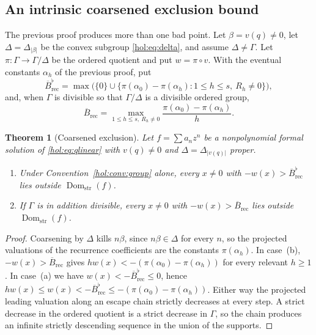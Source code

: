 \documentclass[11pt]{article}
\numberwithin{equation}{section}
\newtheorem{theorem}{Theorem}[section]
\theoremstyle{definition}
\theoremstyle{remark}
\newcommand{\Dom}{\operatorname{Dom}_{\mathrm{str}}}
\newcommand{\abs}[1]{\lvert#1\rvert}
\begin{document}
\subsection{An intrinsic coarsened exclusion bound}

The previous proof produces more than one bad point. Let $\beta=v(q)\ne0$, let
$\Delta=\Delta_{\abs\beta}$ be the convex subgroup \eqref{hol:eq:delta}, and
assume $\Delta\ne\Gamma$. Let $\pi:\Gamma\to\Gamma/\Delta$ be the ordered
quotient and put $w=\pi\circ v$. With the eventual constants $\alpha_h$ of the
previous proof, put
\begin{equation}\label{hol:eq:coarsebound0}
 \overline B^{\flat}_{\mathrm{rec}}
 =\max\bigl(\{0\}\cup\{\pi(\alpha_0)-\pi(\alpha_h):1\le h\le s,\ R_h\ne0\}\bigr),
\end{equation}
and, when $\Gamma$ is divisible so that $\Gamma/\Delta$ is a divisible ordered
group,
\begin{equation}\label{hol:eq:coarsebound}
 \overline B_{\mathrm{rec}}
 =\max_{1\le h\le s,\ R_h\ne0}\frac{\pi(\alpha_0)-\pi(\alpha_h)}{h}.
\end{equation}

\begin{theorem}[Coarsened exclusion]\label{hol:thm:coarse}
Let $f=\sum a_nz^n$ be a nonpolynomial formal solution of
\eqref{hol:eq:qlinear} with $v(q)\ne0$ and $\Delta=\Delta_{\abs{v(q)}}$
proper.
\begin{enumerate}[label=\textup{(\alph*)}]
\item Under Convention~\ref{hol:conv:group} alone, every $x\ne0$ with
$-w(x)>\overline B^{\flat}_{\mathrm{rec}}$ lies outside $\Dom(f)$.
\item If $\Gamma$ is in addition divisible, every $x\ne0$ with
$-w(x)>\overline B_{\mathrm{rec}}$ lies outside $\Dom(f)$.
\end{enumerate}
\end{theorem}

\begin{proof}
Coarsening by $\Delta$ kills $n\beta$, since $n\beta\in\Delta$ for every $n$,
so the projected valuations of the recurrence coefficients are the constants
$\pi(\alpha_h)$. In case~(b), $-w(x)>\overline B_{\mathrm{rec}}$ gives
$hw(x)<-(\pi(\alpha_0)-\pi(\alpha_h))$ for every relevant $h\ge1$. In case~(a)
we have $w(x)<-\overline B^{\flat}_{\mathrm{rec}}\le0$, hence
$hw(x)\le w(x)<-\overline B^{\flat}_{\mathrm{rec}}
 \le-(\pi(\alpha_0)-\pi(\alpha_h))$. Either way the projected leading
valuation along an escape chain strictly decreases at every step. A strict
decrease in the ordered quotient is a strict decrease in $\Gamma$, so the
chain produces an infinite strictly descending sequence in the union of the
supports.
\end{proof}
\end{document}
